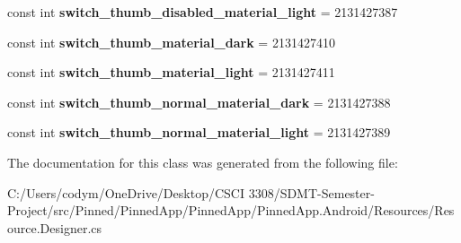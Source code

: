 \begin{DoxyCompactItemize}
\item 
\mbox{\label{class_pinned_app_1_1_droid_1_1_resource_1_1_color_a70e2b0e703f9b354792ae688a22bef23}} 
const int {\bfseries switch\+\_\+thumb\+\_\+disabled\+\_\+material\+\_\+light} = 2131427387
\item 
\mbox{\label{class_pinned_app_1_1_droid_1_1_resource_1_1_color_af3c4966127af732daa915090508f7be4}} 
const int {\bfseries switch\+\_\+thumb\+\_\+material\+\_\+dark} = 2131427410
\item 
\mbox{\label{class_pinned_app_1_1_droid_1_1_resource_1_1_color_afe3f3c93b8920a086db667198b705a24}} 
const int {\bfseries switch\+\_\+thumb\+\_\+material\+\_\+light} = 2131427411
\item 
\mbox{\label{class_pinned_app_1_1_droid_1_1_resource_1_1_color_a023c324acfe46201cb342ee5d6db7639}} 
const int {\bfseries switch\+\_\+thumb\+\_\+normal\+\_\+material\+\_\+dark} = 2131427388
\item 
\mbox{\label{class_pinned_app_1_1_droid_1_1_resource_1_1_color_afc4771c11446ca4242111c090329c855}} 
const int {\bfseries switch\+\_\+thumb\+\_\+normal\+\_\+material\+\_\+light} = 2131427389
\end{DoxyCompactItemize}


The documentation for this class was generated from the following file\+:\begin{DoxyCompactItemize}
\item 
C\+:/\+Users/codym/\+One\+Drive/\+Desktop/\+C\+S\+C\+I 3308/\+S\+D\+M\+T-\/\+Semester-\/\+Project/src/\+Pinned/\+Pinned\+App/\+Pinned\+App/\+Pinned\+App.\+Android/\+Resources/Resource.\+Designer.\+cs\end{DoxyCompactItemize}
